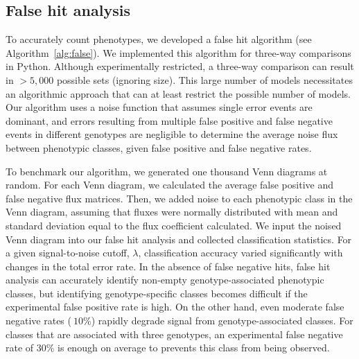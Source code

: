 \documentclass[8pt, twocolumn]{article}
\begin{document}

\subsection*{False hit analysis}
To accurately count phenotypes, we developed a false hit algorithm (see
Algorithm~\ref{alg:false}). We implemented this algorithm for three-way
comparisons in Python. Although experimentally restricted, a three-way
comparison can result in $>5,000$ possible sets (ignoring
size). This large number of models necessitates an algorithmic approach that can
at least restrict the possible number of models. Our algorithm uses a noise
function that assumes single error events are dominant, and errors resulting
from multiple false positive and false negative events in different genotypes
are negligible to determine the average noise flux between phenotypic classes,
given false positive and false negative rates.

To benchmark our algorithm, we generated one thousand Venn diagrams at random.
For each Venn diagram, we calculated the average false positive and false
negative flux matrices. Then, we added noise to each phenotypic class in the
Venn diagram, assuming that fluxes were normally distributed with mean and
standard deviation equal to the flux coefficient calculated. We input the noised
Venn diagram into our false hit analysis and collected classification
statistics. For a given signal-to-noise cutoff, $\lambda$, classification
accuracy varied significantly with changes in the total error rate. In the
absence of false negative hits, false hit analysis can accurately identify
non-empty genotype-associated phenotypic classes, but identifying
genotype-specific classes becomes difficult if the experimental false positive
rate is high. On the other hand, even moderate false negative rates ($~10\%$)
rapidly degrade signal from genotype-associated classes. For classes that are
associated with three genotypes, an experimental false negative rate of 30\% is
enough on average to prevents this class from being observed.
\end{document}
